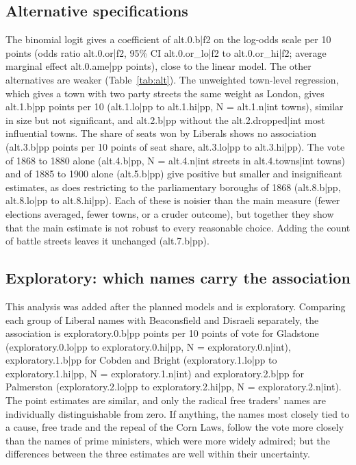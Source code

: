 \documentclass[11pt,a4paper]{article}
\begin{document}
\subsection{Alternative specifications}
The binomial logit gives a coefficient of {{alt.0.b|f2}} on the log-odds scale per 10 points (odds ratio {{alt.0.or|f2}}, 95\% CI {{alt.0.or_lo|f2}} to {{alt.0.or_hi|f2}}; average marginal effect {{alt.0.ame|pp}} points), close to the linear model. The other alternatives are weaker (Table~\ref{tab:alt}). The unweighted town-level regression, which gives a town with two party streets the same weight as London, gives {{alt.1.b|pp}} points per 10 ({{alt.1.lo|pp}} to {{alt.1.hi|pp}}, N = {{alt.1.n|int}} towns), similar in size but not significant, and {{alt.2.b|pp}} without the {{alt.2.dropped|int}} most influential towns. The share of seats won by Liberals shows no association ({{alt.3.b|pp}} points per 10 points of seat share, {{alt.3.lo|pp}} to {{alt.3.hi|pp}}). The vote of 1868 to 1880 alone ({{alt.4.b|pp}}, N = {{alt.4.n|int}} streets in {{alt.4.towns|int}} towns) and of 1885 to 1900 alone ({{alt.5.b|pp}}) give positive but smaller and insignificant estimates, as does restricting to the parliamentary boroughs of 1868 ({{alt.8.b|pp}}, {{alt.8.lo|pp}} to {{alt.8.hi|pp}}). Each of these is noisier than the main measure (fewer elections averaged, fewer towns, or a cruder outcome), but together they show that the main estimate is not robust to every reasonable choice. Adding the count of battle streets leaves it unchanged ({{alt.7.b|pp}}).

\subsection{Exploratory: which names carry the association}
This analysis was added after the planned models and is exploratory. Comparing each group of Liberal names with Beaconsfield and Disraeli separately, the association is {{exploratory.0.b|pp}} points per 10 points of vote for Gladstone ({{exploratory.0.lo|pp}} to {{exploratory.0.hi|pp}}, N = {{exploratory.0.n|int}}), {{exploratory.1.b|pp}} for Cobden and Bright ({{exploratory.1.lo|pp}} to {{exploratory.1.hi|pp}}, N = {{exploratory.1.n|int}}) and {{exploratory.2.b|pp}} for Palmerston ({{exploratory.2.lo|pp}} to {{exploratory.2.hi|pp}}, N = {{exploratory.2.n|int}}). The point estimates are similar, and only the radical free traders' names are individually distinguishable from zero. If anything, the names most closely tied to a cause, free trade and the repeal of the Corn Laws, follow the vote more closely than the names of prime ministers, which were more widely admired; but the differences between the three estimates are well within their uncertainty.
\end{document}
